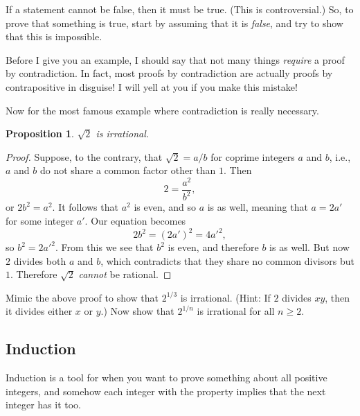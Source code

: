 \documentclass[12pt]{article}
\newtheorem{proposition}{Proposition}
\theoremstyle{definition}
\begin{document}
If a statement cannot be false, then it must be true. (This is controversial.)
So, to prove that something is true, start by assuming that it is \emph{false},
and try to show that this is impossible.

Before I give you an example, I should say that not many things \emph{require}
a proof by contradiction. In fact, most proofs by contradiction are actually
proofs by contrapositive in disguise! I will yell at you if you make this
mistake!

Now for the most famous example where contradiction is really necessary.

\begin{proposition}
    $\sqrt{2}$ is irrational.
\end{proposition}

\begin{proof}
    Suppose, to the contrary, that $\sqrt{2} = a / b$ for coprime integers $a$
    and $b$, i.e., $a$ and $b$ do not share a common factor other than $1$.
    Then
    \begin{equation*}
        2 = \frac{a^2}{b^2},
    \end{equation*}
    or $2 b^2 = a^2$. It follows that $a^2$ is even, and so $a$ is as well,
    meaning that $a = 2a'$ for some integer $a'$. Our equation becomes
    \begin{equation*}
        2 b^2 = (2a')^2 = 4a'^2,
    \end{equation*}
    so $b^2 = 2a'^2$. From this we see that $b^2$ is even, and therefore $b$ is
    as well. But now $2$ divides both $a$ and $b$, which contradicts that they
    share no common divisors but $1$. Therefore $\sqrt{2}$ \emph{cannot} be
    rational.
\end{proof}

\begin{Exercise}
    Mimic the above proof to show that $2^{1/3}$ is irrational. (Hint: If $2$
    divides $xy$, then it divides either $x$ or $y$.) Now show that $2^{1/n}$
    is irrational for all $n \geq 2$.
\end{Exercise}

\subsection*{Induction}

Induction is a tool for when you want to prove something about all positive
integers, and somehow each integer with the property implies that the next
integer has it too.
\end{document}
